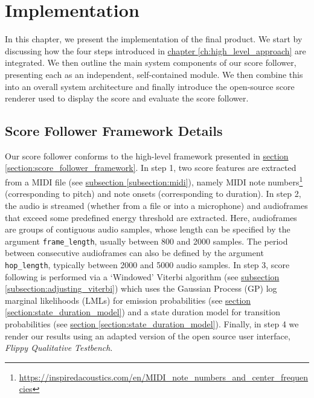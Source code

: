 \chapter{Implementation}{\label{ch:implementation}}
In this chapter, we present the implementation of the final product. We start by discussing how the four steps introduced in \hyperref[ch:high_level_approach]{chapter \ref*{ch:high_level_approach}} are integrated. We then outline the main system components of our score follower, presenting each as an independent, self-contained module. We then combine this into an overall system architecture and finally introduce the open-source score renderer used to display the score and evaluate the score follower.       



\section{Score Follower Framework Details}
Our score follower conforms to the high-level framework presented in \hyperref[section:score_follower_framework]{section \ref*{section:score_follower_framework}}. In step 1, two score features are extracted from a MIDI file (see \hyperref[subsection:midi]{subsection \ref*{subsection:midi}}), namely MIDI note numbers\footnote{\href{https://inspiredacoustics.com/en/MIDI_note_numbers_and_center_frequencies}{https://inspiredacoustics.com/en/MIDI\_note\_numbers\_and\_center\_frequencies}} (corresponding to pitch) and note onsets (corresponding to duration). In step 2, the audio is streamed (whether from a file or into a microphone) and audioframes that exceed some predefined energy threshold are extracted. Here, audioframes are groups of contiguous audio samples, whose length can be specified by the argument \verb|frame_length|, usually between 800 and 2000 samples. The period between consecutive audioframes can also be defined by the argument \verb|hop_length|, typically between 2000 and 5000 audio samples. In step 3, score following is performed via a `Windowed' Viterbi algorithm (see  \hyperref[subsection:adjusting_viterbi]{subsection \ref*{subsection:adjusting_viterbi}}) which uses the Gaussian Process (GP) log marginal likelihoods (LMLs) for emission probabilities (see \hyperref[section:state_duration_model]{section \ref*{section:state_duration_model}}) and a state duration model for transition probabilities (see \hyperref[section:state_duration_model]{section \ref*{section:state_duration_model}}). Finally, in step 4 we render our results using an adapted version of the open source user interface, \textit{Flippy Qualitative Testbench}.

